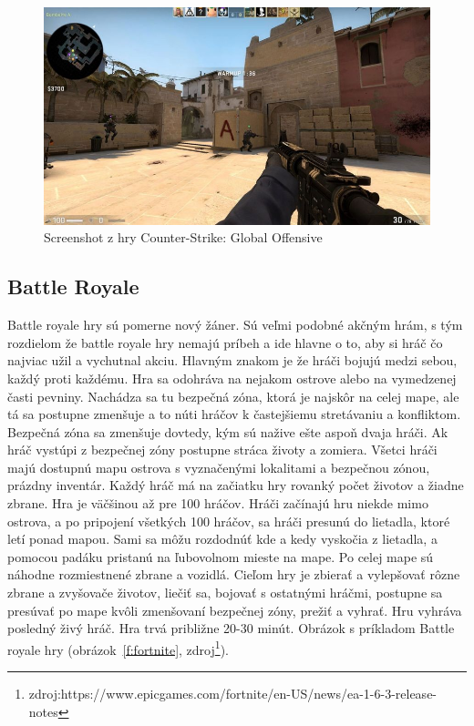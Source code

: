 \documentclass[10pt,oneside,slovak,a4paper]{article}
\begin{document}
\begin{figure}[tbh]
\centering
\includegraphics[scale=0.2]{csgo.jpg}
\caption{Screenshot z hry Counter-Strike: Global Offensive}
\label{f:csgo}
\end{figure}

\subsection{Battle Royale} \label{zanre:battleroyale}

Battle royale hry sú pomerne nový žáner. Sú veľmi podobné akčným hrám, s tým rozdielom že battle royale hry nemajú príbeh a ide hlavne o to, aby si hráč čo najviac užil a vychutnal akciu. Hlavným znakom je že hráči bojujú medzi sebou, každý proti každému. Hra sa odohráva na nejakom ostrove alebo na vymedzenej časti pevniny. Nachádza sa tu bezpečná zóna, ktorá je najskôr na celej mape, ale tá sa postupne zmenšuje a to núti hráčov k častejšiemu stretávaniu a konfliktom. Bezpečná zóna sa zmenšuje dovtedy, kým sú nažive ešte aspoň dvaja hráči. Ak hráč vystúpi z bezpečnej zóny postupne stráca životy a zomiera. Všetci hráči majú dostupnú mapu ostrova s vyznačenými lokalitami a bezpečnou zónou, prázdny inventár. Každý hráč má na začiatku hry rovanký počet životov a žiadne zbrane. Hra je väčšinou až pre 100 hráčov. Hráči začínajú hru niekde mimo ostrova, a po pripojení všetkých 100 hráčov, sa hráči presunú do lietadla, ktoré letí ponad mapou. Sami sa môžu rozdodnúť kde a kedy vyskočia z lietadla, a pomocou padáku pristanú na ľubovolnom mieste na mape. Po celej mape sú náhodne rozmiestnené zbrane a vozidlá. Cieľom hry je zbierať a vylepšovať rôzne zbrane a zvyšovače životov, liečiť sa, bojovať s ostatnými hráčmi, postupne sa presúvať po mape kvôli zmenšovaní bezpečnej zóny, prežiť a vyhrať. Hru vyhráva posledný živý hráč. Hra trvá približne 20-30 minút. Obrázok s príkladom Battle royale hry (obrázok~\ref{f:fortnite}, zdroj\footnote{zdroj:https://www.epicgames.com/fortnite/en-US/news/ea-1-6-3-release-notes}).
\end{document}
